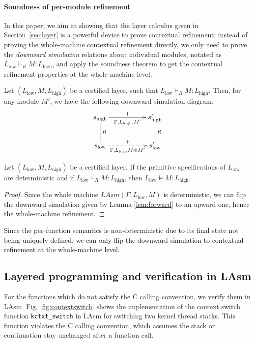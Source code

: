 \paragraph{Soundness of per-module refinement}

In this paper, we aim at showing that the layer calculus given in
Section~{\ref{sec:layer}} is a powerful device to prove contextual
refinement: instead of proving the whole-machine contextual refinement directly, 
we only need to prove the \emph{downward simulation} relations about
individual modules, notated as $L_{\text{low}} \vdash_R M : L_{\text{high}}$, 
and apply the soundness theorem to get the contextual refinement properties
at the whole-machine level.

\begin{lemma} \label{lem:forward}
Let $(L_{\text{low}}, M, L_{\text{high}})$ be a certified layer,
such that $L_{\text{low}} \vdash_R M : L_{\text{high}}$. Then,
for any module $M'$, we have the following downward simulation diagram:
\[
\xymatrix{
s_{\text{high}} \ar[rr]_{\Gamma, L_{\text{high}}, M'}^1 \ar@{-}[d]^R & & s'_{\text{high}} \ar@{.}[d]^R \\
s_{\text{low}} \ar@{.>}[rr]_{\Gamma, L_{\text{low}}, M \oplus M'}^{+} & & s'_{\text{low}}
}
\]
\end{lemma}

\begin{theorem}[Soundness]\label{thm:sound}
Let $(L_{\text{low}}, M, L_{\text{high}})$ be a certified layer. If the
primitive specifications of $L_{\text{low}}$ are deterministic and if
$L_{\text{low}} \vdash_R M : L_{\text{high}}$, then $L_{\text{low}}
\vDash M : L_{\text{high}}$.
\end{theorem}
\begin{proof}
Since the whole machine {\small $LAsm(\Gamma, L_{\text{low}}, M)$} is
deterministic, we can flip the downward simulation given by Lemma
\ref{lem:forward} to an upward one, hence the whole-machine refinement.
\end{proof}

Since the per-function semantics is non-deterministic due to its final
state not being uniquely defined, we can only flip the downward
simulation to contextual refinement at the whole-machine level.


\subsection{Layered programming and verification in LAsm}
For the functions which do not satisfy the C calling convention, we verify them in 
LAsm. Fig. \ref{fig:contextswitch} shows the implementation of the context switch function
\verb"kctxt_switch" in LAsm for switching two kernel thread stacks. This function violates
the C calling convention, which assumes the stack or continuation stay unchanged after
a function call.

